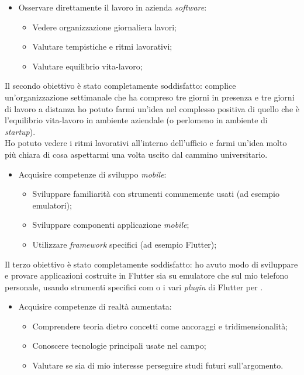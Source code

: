 \begin{itemize}
  \item Osservare direttamente il lavoro in azienda \textit{software}:
    \begin{itemize}
        \item Vedere organizzazione giornaliera lavori;
        \item Valutare tempistiche e ritmi lavorativi;
        \item Valutare equilibrio vita-lavoro;
    \end{itemize}
\end{itemize}

Il secondo obiettivo è stato completamente soddisfatto: complice un'organizzazione settimanale che ha compreso tre giorni in presenza e tre giorni di lavoro a distanza ho potuto farmi un'idea nel complesso positiva di quello che è l'equilibrio vita-lavoro in ambiente aziendale (o perlomeno in ambiente di \textit{startup}).\\
Ho potuto vedere i ritmi lavorativi all'interno dell'ufficio e farmi un'idea molto più chiara di cosa aspettarmi una volta uscito dal cammino universitario.

\begin{itemize}
  \item Acquisire competenze di sviluppo \textit{mobile}:
        \begin{itemize}
            \item Sviluppare familiarità con strumenti comunemente usati (ad esempio emulatori);
            \item Sviluppare componenti applicazione \textit{mobile};
            \item Utilizzare \textit{framework} specifici (ad esempio Flutter);
        \end{itemize}
\end{itemize}

Il terzo obiettivo è stato completamente soddisfatto: ho avuto modo di sviluppare e provare applicazioni costruite in Flutter sia su emulatore che sul mio telefono personale, usando strumenti specifici com \astudio{} o i vari \textit{plugin} di Flutter per \vsc{}.

\begin{itemize}
  \item Acquisire competenze di realtà aumentata:
        \begin{itemize}
            \item Comprendere teoria dietro concetti come ancoraggi e tridimensionalità;
            \item Conoscere tecnologie principali usate nel campo;
            \item Valutare se sia di mio interesse perseguire studi futuri sull'argomento.
        \end{itemize}
\end{itemize}

